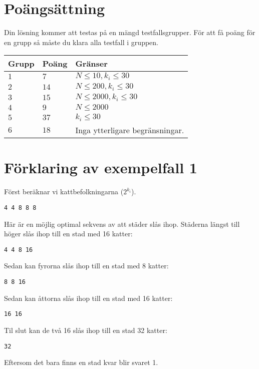 \section*{Poängsättning}
Din lösning kommer att testas på en mängd testfallsgrupper.
För att få poäng för en grupp så måste du klara alla testfall i gruppen.

\noindent
\begin{tabular}{| l | l | p{12cm} |}
  \hline
  \textbf{Grupp} & \textbf{Poäng} & \textbf{Gränser} \\ \hline
  $1$    & $7$       & $N \leq 10, k_i \leq 30$ \\ \hline
  $2$    & $14$      & $N \leq 200, k_i \leq 30$ \\ \hline
  $3$    & $15$      & $N \leq 2000, k_i \leq 30$ \\ \hline
  $4$    & $9$       & $N \leq 2000$ \\ \hline
  $5$    & $37$      & $k_i \leq 30$ \\ \hline
  $6$    & $18$      & Inga ytterligare begränsningar. \\ \hline
\end{tabular}

\section*{Förklaring av exempelfall 1}

Först beräknar vi kattbefolkningarna ($2^{k_i}$).
\begin{verbatim}
4 4 8 8 8
\end{verbatim}
Här är en möjlig optimal sekvens av att städer slås ihop.
Städerna längst till höger slås ihop till en stad med 16 katter:
\begin{verbatim}
4 4 8 16
\end{verbatim}
Sedan kan fyrorna slås ihop till en stad med 8 katter:
\begin{verbatim}
8 8 16
\end{verbatim}
Sedan kan åttorna slås ihop till en stad med 16 katter:
\begin{verbatim}
16 16
\end{verbatim}
Til slut kan de två 16 slås ihop till en stad 32 katter:
\begin{verbatim}
32
\end{verbatim}

Eftersom det bara finns en stad kvar blir svaret 1.
